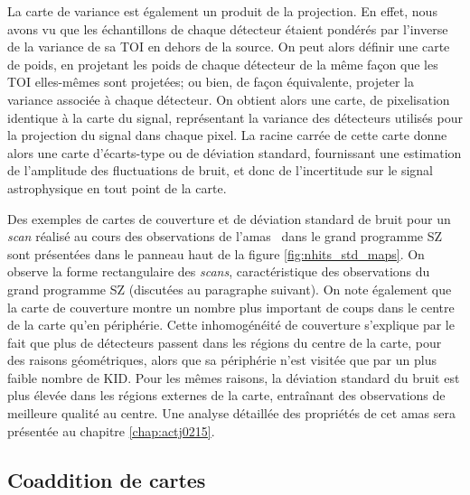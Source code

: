 La carte de variance est également un produit de la projection.
En effet, nous avons vu que les échantillons de chaque détecteur étaient pondérés par l'inverse de la variance de sa TOI en dehors de la source.
On peut alors définir une carte de poids, en projetant les poids de chaque détecteur de la même façon que les TOI elles-mêmes sont projetées; ou bien, de façon équivalente, projeter la variance associée à chaque détecteur.
On obtient alors une carte, de pixelisation identique à la carte du signal, représentant la variance des détecteurs utilisés pour la projection du signal dans chaque pixel.
La racine carrée de cette carte donne alors une carte d'écarts-type ou de déviation standard, fournissant une estimation de l'amplitude des fluctuations de bruit, et donc de l'incertitude sur le signal astrophysique en tout point de la carte.

Des exemples de cartes de couverture et de déviation standard de bruit pour un \textit{scan} réalisé au cours des observations de l'amas \act\ dans le grand programme SZ sont présentées dans le panneau haut de la figure \ref{fig:nhits_std_maps}.
On observe la forme rectangulaire des \textit{scans}, caractéristique des observations du grand programme SZ (discutées au paragraphe suivant).
On note également que la carte de couverture montre un nombre plus important de coups dans le centre de la carte qu'en périphérie.
Cette inhomogénéité de couverture s'explique par le fait que plus de détecteurs passent dans les régions du centre de la carte, pour des raisons géométriques, alors que sa périphérie n'est visitée que par un plus faible nombre de KID.
Pour les mêmes raisons, la déviation standard du bruit est plus élevée dans les régions externes de la carte, entraînant des observations de meilleure qualité au centre.
Une analyse détaillée des propriétés de cet amas sera présentée au chapitre \ref{chap:actj0215}.

\subsection{Coaddition de cartes} \label{sec:map_coadd}


